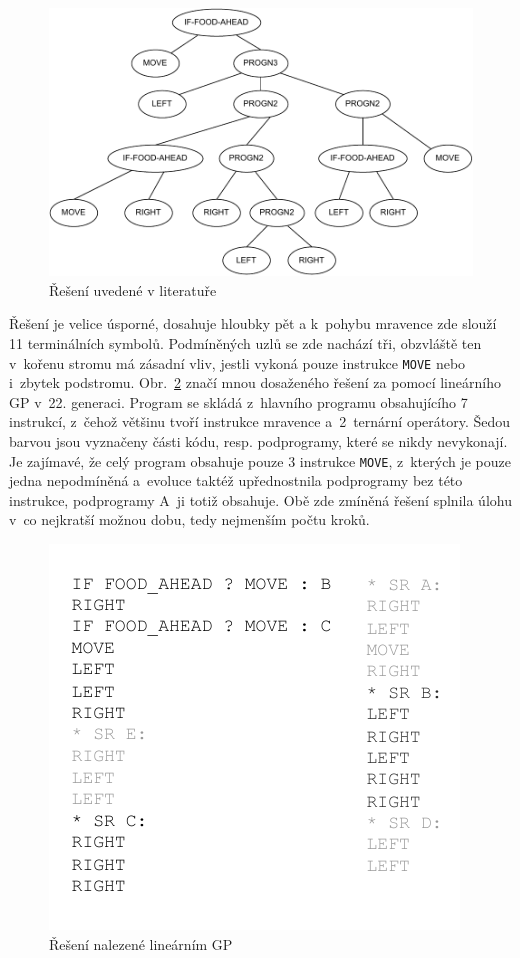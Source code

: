 \begin{figure}[!h]
    \centering
    \includegraphics[scale=0.65]{obrazky-figures/lit-santafe-example-tree.pdf}
    \caption{Řešení uvedené v literatuře}
    \label{fig:lit-santafe-example-tree}
\end{figure}

Řešení je velice úsporné, dosahuje hloubky pět a k~pohybu mravence zde slouží 11 terminálních symbolů. Podmíněných uzlů se zde nachází tři, obzvláště ten v~kořenu stromu má zásadní vliv, jestli vykoná pouze instrukce \texttt{MOVE} nebo i~zbytek podstromu. Obr.~\ref{fig:lgp-santa-fe-comp-w-lit} značí mnou dosaženého řešení za pomocí lineárního GP v~22. generaci. Program se skládá z~hlavního programu obsahujícího 7 instrukcí, z~čehož většinu tvoří instrukce mravence a~2~ternární operátory. Šedou barvou jsou vyznačeny části kódu, resp. podprogramy, které se nikdy nevykonají. Je zajímavé, že celý program obsahuje pouze 3 instrukce \texttt{MOVE}, z~kterých je pouze jedna nepodmíněná a~evoluce taktéž upřednostnila podprogramy bez této instrukce, podprogramy A~ji totiž obsahuje. Obě zde zmíněná řešení splnila úlohu v~co nejkratší možnou dobu, tedy nejmenším počtu kroků.

\begin{figure}[]
    \centering
    \includegraphics[scale=1]{obrazky-figures/lgp-santa-fe-comp-w-lit.pdf}
    \caption{Řešení nalezené lineárním GP}
    \label{fig:lgp-santa-fe-comp-w-lit}
\end{figure}

